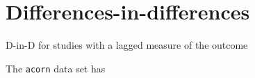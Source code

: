 \section{Differences-in-differences}

\begin{frame}{D-in-D for studies with a lagged measure of the outcome}

The \texttt{acorn} data set has

  

\end{frame}

